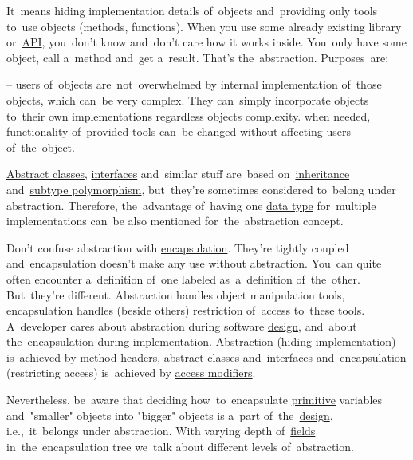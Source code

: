 \label{abstraction}
It~means hiding implementation details of~objects and~providing only tools to~use objects (methods, functions).
When you use some already existing library or~\hyperref[api]{API}, you~don't know and~don't care how it works inside.
You~only have some object, call a~method and~get a~result.
That's the~abstraction.
Purposes~are:
\begin{itemize}
     -- users of~objects are~not~overwhelmed by internal implementation of~those objects, which can~be very complex.
            They can~simply incorporate objects to~their own implementations regardless objects complexity.
     when needed, functionality of~provided tools can~be changed without affecting users of~the~object.
\end{itemize}

\warning \hyperref[javaabstractclasses]{Abstract classes}, \hyperref[javainterfaces]{interfaces} and~similar stuff are~based on~\hyperref[inheritance]{inheritance} and~\hyperref[polymorphism]{subtype polymorphism}, but~they're sometimes considered to~belong under abstraction.
Therefore, the~advantage of~having one \hyperref[datatypes]{data type} for~multiple implementations can~be also mentioned for~the~abstraction concept.

\warning Don't confuse abstraction with \hyperref[encapsulation]{encapsulation}.
They're tightly coupled and~encapsulation doesn't make any use without abstraction.
You~can quite often encounter a~definition of~one labeled as~a~definition of~the~other.
But~they're different.
Abstraction handles object manipulation tools, encapsulation handles (beside others) restriction of~access to~these tools.
A~developer cares about abstraction during software \hyperref[architecturedesign]{design}, and~about the~encapsulation during implementation.
Abstraction (hiding implementation) is~achieved by method headers, \hyperref[javaabstractclasses]{abstract classes} and~\hyperref[javainterfaces]{interfaces} and~encapsulation (restricting access) is~achieved by \hyperref[javaaccessmodifiers]{access modifiers}.

Nevertheless, be~aware that deciding how~to~encapsulate \hyperref[javaprimitivetypes]{primitive} variables and~"smaller" objects into "bigger" objects is a~part of~the~\hyperref[architecturedesign]{design}, i.e.,~it~belongs under abstraction.
With varying depth of~\hyperref[variablefieldproperty]{fields} in~the~encapsulation tree we~talk about different levels of~abstraction.
\newpage

